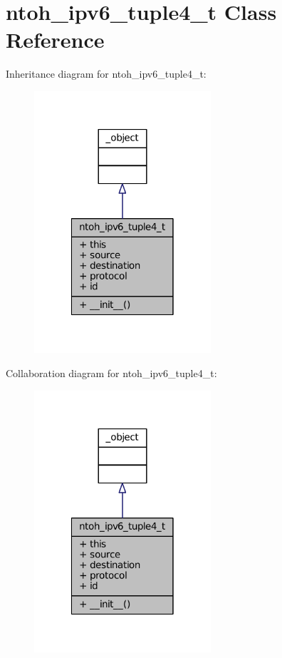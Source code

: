 \hypertarget{classlibntoh_1_1ntoh__ipv6__tuple4__t}{\section{ntoh\-\_\-ipv6\-\_\-tuple4\-\_\-t Class Reference}
\label{classlibntoh_1_1ntoh__ipv6__tuple4__t}
}


Inheritance diagram for ntoh\-\_\-ipv6\-\_\-tuple4\-\_\-t\-:
\nopagebreak
\begin{figure}[H]
\begin{center}
\leavevmode
\includegraphics[width=186pt]{classlibntoh_1_1ntoh__ipv6__tuple4__t__inherit__graph}
\end{center}
\end{figure}


Collaboration diagram for ntoh\-\_\-ipv6\-\_\-tuple4\-\_\-t\-:
\nopagebreak
\begin{figure}[H]
\begin{center}
\leavevmode
\includegraphics[width=186pt]{classlibntoh_1_1ntoh__ipv6__tuple4__t__coll__graph}
\end{center}
\end{figure}
